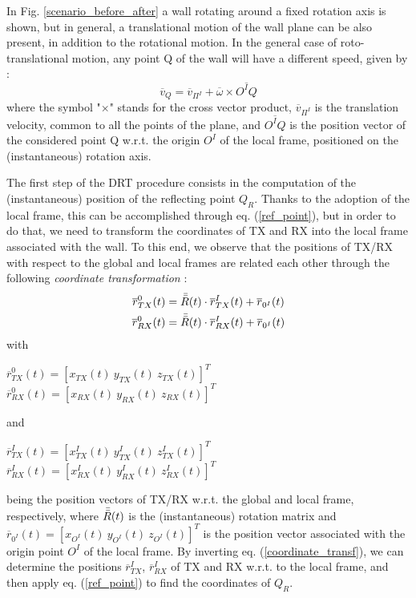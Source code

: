 In Fig. \ref{scenario_before_after} a wall rotating around a fixed rotation axis is shown, but in general, a translational motion of the wall plane can be also present, in addition to the rotational motion.
In the general case of roto-translational motion, any point Q of the wall will have a different speed, given by \cite{Martin1968}:
\begin{equation}
\overline{v}_Q=\overline{v}_{\Pi^I}+\overline{\omega} \times \overline{O^IQ}
\label{RigidBodyMotion}
\end{equation}
where the symbol "$\times$" stands for the cross vector product, $\overline{v}_{\Pi^I}$ is the translation velocity, common to all the points of the plane, and $\overline{O^IQ}$ is the position vector of the considered point Q w.r.t. the origin $O^I$ of the local frame, positioned on the (instantaneous) rotation axis.
\par

The first step of the DRT procedure consists in the computation of the (instantaneous) position of the reflecting point $Q_R$. Thanks to the adoption of the local frame, this can be accomplished through eq. (\ref{ref_point}), but in order to do that, we need to transform the coordinates of TX and RX into the local frame associated with the wall. To this end, we observe that the positions of TX/RX with respect to the global and local frames are related each other through the following \textit{coordinate transformation} \cite{Martin1968}:
\begin{equation}
\begin{gathered}
    \overline{r}_{TX}^0(t) = \Bar{\Bar{R}}(t) \cdot \overline{r}_{TX}^{I}(t) + \overline{r}_{0^I}(t) \\
    \overline{r}_{RX}^0(t) = \Bar{\Bar{R}}(t) \cdot \overline{r}_{RX}^{I}(t) + \overline{r}_{0^I}(t)
\end{gathered}
\label{coordinate_transf}
\end{equation}
with
\begin{center}
\begin{small}
$\overline{r}_{TX}^0(t)=[x_{TX}(t)~y_{TX}(t)~z_{TX}(t)]^T$ \\
$\overline{r}_{RX}^0(t)=[x_{RX}(t)~y_{RX}(t)~z_{RX}(t)]^T$
\end{small}
\end{center} 
and 
\begin{center}
\begin{small}
$\overline{r}_{TX}^I(t)=[x_{TX}^I(t)~y_{TX}^I(t)~z_{TX}^I(t)]^T$ \\
$\overline{r}_{RX}^I(t)=[x_{RX}^I(t)~y_{RX}^I(t)~z_{RX}^I(t)]^T$ 
\end{small} 
\end{center}
being the position vectors of TX/RX w.r.t. the global and local frame, respectively, where $\Bar{\Bar{R}}(t)$ is the (instantaneous) rotation matrix and $\overline{r}_{0^I}(t)=[x_{O^I}(t)~y_{O^I}(t)~z_{O^I}(t)]^T$ is the position vector associated with the origin point $O^{I}$ of the local frame. By inverting eq. (\ref{coordinate_transf}), we can determine the positions $\overline{r}_{TX}^I$, $\overline{r}_{RX}^I$ of TX and RX w.r.t. to the local frame, and then apply eq. (\ref{ref_point}) to find the coordinates of $Q_R$.


